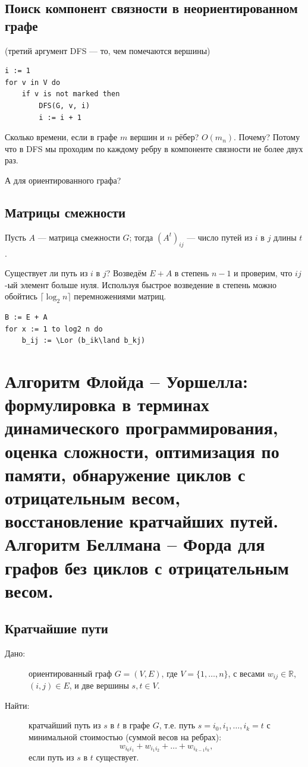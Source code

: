 \documentclass[a4paper,12pt]{article}
\begin{document}
\subsection{Поиск компонент связности в неориентированном графе}
(третий аргумент DFS --- то,  чем помечаются вершины)
\begin{lstlisting}
i := 1
for v in V do
    if v is not marked then
        DFS(G, v, i)
        i := i + 1
\end{lstlisting}

Сколько времени, если в графе $m$ вершин и $n$ рёбер? $O(m_n)$. Почему? Потому что в DFS мы проходим по каждому ребру в компоненте связности не более двух раз.

А для ориентированного графа?



\subsection{Матрицы смежности}
Пусть $A$ --- матрица смежности $G$; тогда $(A^t)_{ij}$ --- число путей из $i$ в $j$ длины $t$.

Существует ли путь из $i$ в $j$? Возведём $E+A$ в степень $n-1$ и проверим, что $ij$-ый элемент больше нуля. Используя быстрое возведение в степень можно обойтись $\lceil\log_2n\rceil$ перемножениями матриц.

\begin{lstlisting}
B := E + A
for x := 1 to log2 n do
    b_ij := \Lor (b_ik\land b_kj)
\end{lstlisting}

\newpage
\section{Алгоритм Флойда – Уоршелла: формулировка в терминах динамического программирования, оценка сложности, оптимизация по памяти, обнаружение циклов с отрицательным весом, восстановление кратчайших путей. Алгоритм Беллмана – Форда для графов без циклов с отрицательным весом.}

\subsection{Кратчайшие пути}
\begin{description}
	\item[Дано:] ориентированный граф $G = (V, E)$, где $V = \{1, \dots, n\}$, с весами $w_{ij}\in\mathbb R$, $(i, j) \in E$, и две вершины $s, t \in V$.
	\item[Найти:] кратчайший путь из $s$ в $t$ в графе $G$, т.е. путь $s = i_0, i_1, \ldots, i_k = t$ с минимальной стоимостью (суммой весов на ребрах):
	\[w_{i_0i_1} + w_{i_1i_2} + \dots + w_{i_{k-1}i_k},\]
	если путь из $s$ в $t$ существует.
\end{description}
\end{document}

